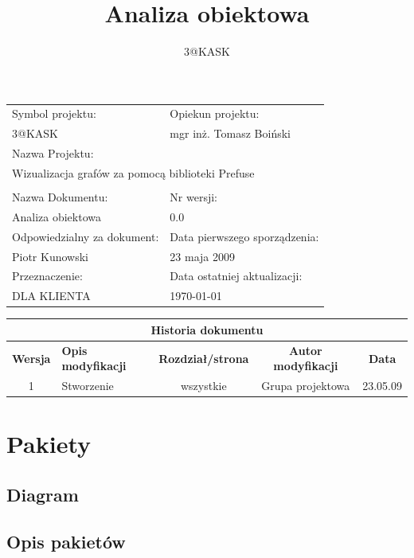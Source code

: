 \documentclass[a4paper,10pt]{article}
\title{Analiza obiektowa}
\author{3@KASK}
\begin{document}



\maketitle


\begin{center}
\begin{longtable}{|p{7cm}|p{7cm}|}
\hline
Symbol projektu: & Opiekun projektu:   \tabularnewline 
3@KASK & mgr inż. Tomasz Boiński    \tabularnewline \hline
\multicolumn{2}{|l|}{Nazwa Projektu: } \tabularnewline
\multicolumn{2}{|l|}{Wizualizacja grafów za pomocą biblioteki Prefuse } \tabularnewline 
\hline
\multicolumn{2}{l}{ } \tabularnewline %
\hline 
Nazwa Dokumentu: & Nr wersji:   \tabularnewline 
Analiza obiektowa & 0.0 \tabularnewline \hline
Odpowiedzialny za dokument: & Data pierwszego sporządzenia:   \tabularnewline 
Piotr Kunowski & 23 maja 2009 \tabularnewline \hline
Przeznaczenie: & Data ostatniej aktualizacji:   \tabularnewline 
DLA KLIENTA & \today \tabularnewline \hline
\end{longtable}
\end{center}


\begin{center}
\begin{longtable}{|c|p{4cm}|c|c|c|}
\multicolumn{5}{c}{\textbf{Historia dokumentu}} \tabularnewline \hline
\textbf{Wersja} & \textbf{Opis modyfikacji} & \textbf{Rozdział/strona} & \textbf{Autor modyfikacji} & \textbf{Data} \tabularnewline \hline 
1 & Stworzenie & wszystkie & Grupa projektowa & 23.05.09 \tabularnewline \hline

\end{longtable}
\end{center}


\newpage
\tableofcontents
\newpage

\section{Pakiety}

\subsection{Diagram}

\subsection{Opis pakietów}
\end{document}
